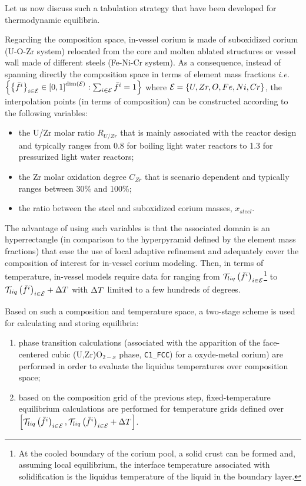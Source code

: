 \documentclass[11pt]{article}\usepackage{geometry} \geometry{letterpaper, margin=25.4mm}
\newcommand{\T}{\texttt}
\newcommand{\Mc}[1]{{\mathcal #1}}
\begin{document}
Let us now discuss such a tabulation strategy that have been developed for thermodynamic equilibria.

Regarding the composition space, in-vessel corium is made of suboxidized corium (U-O-Zr system) relocated from the core and molten ablated structures or vessel wall made of different steels (Fe-Ni-Cr system). As a consequence, instead of spanning directly the composition space in terms of element mass fractions \textit{i.e.} $\left\{ \left\{\elementMassFraction[i]{}\right\}_{i\in \elementSet} \in \left[0,1\right]^{\dim(\elementSet)} : \sum_{i\in \elementSet} \elementMassFraction[i]{} = 1 \right\}$ where $\elementSet = \left\{U,Zr,O,Fe,Ni,Cr\right\}$, the interpolation points (in terms of composition) can be constructed according to the following variables:
\begin{itemize}
 \item the U/Zr molar ratio $R_{U/Zr}$ that is mainly associated with the reactor design and typically ranges from 0.8 for boiling light water reactors to 1.3 for pressurized light water reactors;
 \item the Zr molar oxidation degree $C_{Zr}$ that is scenario dependent and typically ranges between 30\% and 100\%;
 \item the ratio between the steel and suboxidized corium masses, $x_{steel}$.
\end{itemize}
The advantage of using such variables is that the associated domain is an hyperrectangle (in comparison to the hyperpyramid defined by the element mass fractions) that ease the use of local adaptive refinement and adequately cover the composition of interest for in-vessel corium modeling. Then, in terms of temperature, in-vessel models require data for ranging from $\Mc{T}_{liq}\left(\elementMassFraction[i]{}\right)_{i\in\elementSet}$\footnote{At the cooled boundary of the corium pool, a solid crust can be formed and, assuming local equilibrium, the interface temperature associated with solidification is the liquidus temperature of the liquid in the boundary layer.} to $\Mc{T}_{liq}\left(\elementMassFraction[i]{}\right)_{i\in\elementSet} + \Delta\temperature{}$ with $\Delta\temperature{}$ limited to a few hundreds of degrees. 

Based on such a composition and temperature space, a two-stage scheme is used for calculating and storing equilibria:
\begin{enumerate}
 \item phase transition calculations (associated with the apparition of the face-centered cubic (U,Zr)O$_{2-x}$ phase, \T{C1\_FCC}) for a oxyde-metal corium) are performed in order to evaluate the liquidus temperatures over composition space;
 \item based on the composition grid of the previous step, fixed-temperature equilibrium calculations are performed for temperature grids defined over $\left[\Mc{T}_{liq}\left(\elementMassFraction[i]{}\right)_{i\in\elementSet}, \Mc{T}_{liq}\left(\elementMassFraction[i]{}\right)_{i\in\elementSet} + \Delta\temperature{}\right]$.
\end{enumerate}
\end{document}
